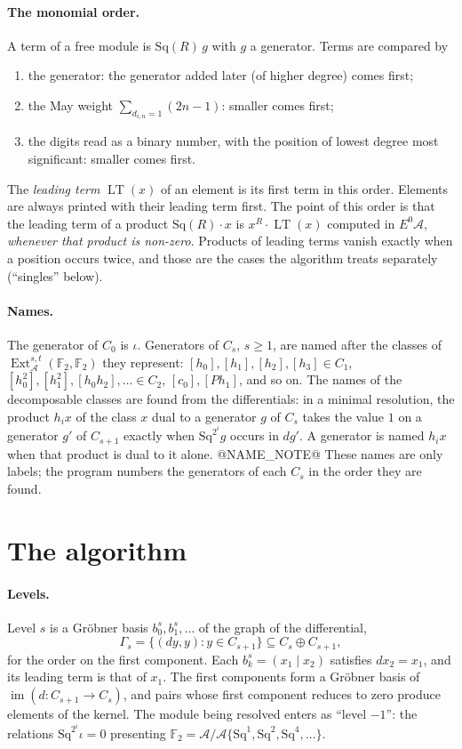 \documentclass[11pt]{article}
\newcommand{\Sq}{\mathrm{Sq}}
\newcommand{\F}{\mathbb{F}_2}
\newcommand{\A}{\mathcal{A}}
\DeclareMathOperator{\LT}{LT}
\DeclareMathOperator{\Ext}{Ext}
\begin{document}
\paragraph{The monomial order.}
A term of a free module is $\Sq(R)\,g$ with $g$ a generator. Terms are compared by
\begin{enumerate}
\item the generator: the generator added later (of higher degree) comes first;
\item the May weight $\sum_{d_{i,n} = 1} (2n - 1)$: smaller comes first;
\item the digits read as a binary number, with the position of lowest degree most significant:
  smaller comes first.
\end{enumerate}
The \emph{leading term} $\LT(x)$ of an element is its first term in this order. Elements are
always printed with their leading term first. The point of this order is that the leading term
of a product $\Sq(R)\cdot x$ is $x^R \cdot \LT(x)$ computed in $E^0\A$, \emph{whenever that
product is non-zero}. Products of leading terms vanish exactly when a position occurs twice, and
those are the cases the algorithm treats separately (``singles'' below).

\paragraph{Names.}
The generator of $C_0$ is $\iota$. Generators of $C_s$, $s \ge 1$, are named after the classes of
$\Ext_\A^{s,t}(\F, \F)$ they represent: $[h_0], [h_1], [h_2], [h_3] \in C_1$, $[h_0^2], [h_1^2],
[h_0h_2], \dots \in C_2$, $[c_0], [Ph_1]$, and so on. The names of the decomposable classes are
found from the differentials: in a minimal resolution, the product $h_i x$ of the class $x$ dual to
a generator $g$ of $C_s$ takes the value $1$ on a generator $g'$ of $C_{s+1}$ exactly when
$\Sq^{2^i} g$ occurs in $d g'$. A generator is named $h_i x$ when that product is dual to it alone.
@NAME_NOTE@ These names are only labels; the program numbers the generators of
each $C_s$ in the order they are found.

\section{The algorithm}

\paragraph{Levels.}
Level $s$ is a Gröbner basis $b^s_0, b^s_1, \dots$ of the graph of the differential,
\[ \Gamma_s = \{ (d y, y) : y \in C_{s+1} \} \subseteq C_s \oplus C_{s+1}, \]
for the order on the first component. Each $b^s_k = (x_1 \mid x_2)$ satisfies $d x_2 = x_1$,
and its leading term is that of $x_1$. The first components form a Gröbner basis of
$\operatorname{im}(d \colon C_{s+1} \to C_s)$, and pairs whose first component reduces to zero
produce elements of the kernel. The module being resolved enters as ``level $-1$'': the relations
$\Sq^{2^i}\iota = 0$ presenting $\F = \A/\A\{\Sq^1, \Sq^2, \Sq^4, \dots\}$.
\end{document}
